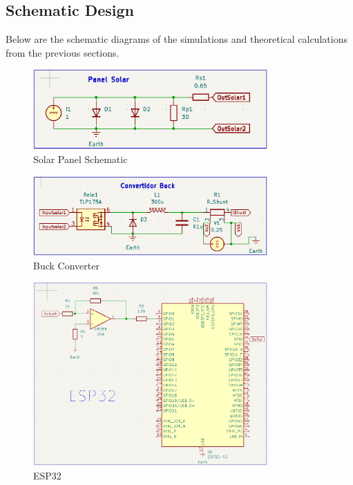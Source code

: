 \subsection{Schematic Design}

Below are the schematic diagrams of the simulations and theoretical calculations from the previous sections.

\begin{figure}[H]
    \centering
    \includegraphics[width=0.8\textwidth]{image/ESQ1}
    \caption{Solar Panel Schematic}\label{ESQ1}
\end{figure}

\begin{figure}[H]
    \centering
    \includegraphics[width=0.8\textwidth]{image/ESQ2}
    \caption{Buck Converter}\label{ESQ2}
\end{figure}

\begin{figure}[H]
    \centering
    \includegraphics[width=0.8\textwidth]{image/ESQ3}
    \caption{ESP32}\label{ESQ3}
\end{figure}

